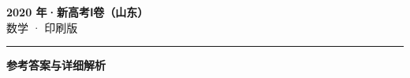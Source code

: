 \documentclass[zihao=5, a4paper]{ctexart}
\begin{document}
\begin{center}
  {\Large\bfseries 2020 年·新高考Ⅰ卷（山东）}\\[4pt]
  {\large 数学 · 印刷版}
\end{center}
\medskip
{}

\par\bigskip\hrule\bigskip
{}
\Needspace{0.55\textheight}
\begin{center}{\large\bfseries 参考答案与详细解析}\end{center}
\smallskip

\end{document}
